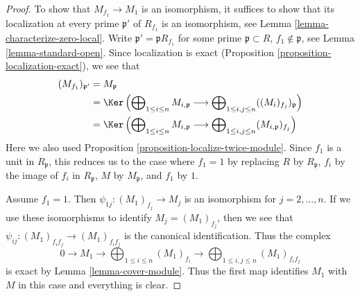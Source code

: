 \begin{proof}
To show that $M_{f_1} \to M_1$ is an isomorphism, it suffices
to show that its localization at every prime $\mathfrak p'$
of $R_{f_1}$ is an isomorphism, see
Lemma \ref{lemma-characterize-zero-local}.
Write $\mathfrak p' = \mathfrak p R_{f_1}$
for some prime $\mathfrak p \subset R$, $f_1 \not \in \mathfrak p$, see
Lemma \ref{lemma-standard-open}.
Since localization is exact
(Proposition \ref{proposition-localization-exact}),
we see that
\begin{align*}
(M_{f_1})_{\mathfrak p'} & =
M_\mathfrak p \\
& =
\Ker\left(
\bigoplus\nolimits_{1 \leq i \leq n} M_{i, \mathfrak p}
\longrightarrow
\bigoplus\nolimits_{1 \leq i, j \leq n} ((M_i)_{f_j})_\mathfrak p
\right) \\
& =
\Ker\left(
\bigoplus\nolimits_{1 \leq i \leq n} M_{i, \mathfrak p}
\longrightarrow
\bigoplus\nolimits_{1 \leq i, j \leq n} (M_{i, \mathfrak p})_{f_j}
\right)
\end{align*}
Here we also used Proposition \ref{proposition-localize-twice-module}.
Since $f_1$ is a unit in $R_\mathfrak p$, this reduces us to the case
where $f_1 = 1$ by replacing $R$ by $R_\mathfrak p$, $f_i$ by the
image of $f_i$ in $R_\mathfrak p$, $M$ by $M_\mathfrak p$, and
$f_1$ by $1$.

\medskip\noindent
Assume $f_1 = 1$. Then $\psi_{1j} : (M_1)_{f_j} \to M_j$
is an isomorphism for $j = 2, \ldots, n$. If we use these
isomorphisms to identify $M_j = (M_1)_{f_j}$, then we see
that $\psi_{ij} : (M_1)_{f_if_j} \to (M_1)_{f_if_j}$ is
the canonical identification. Thus the complex
$$
0 \to M_1 \to
\bigoplus\nolimits_{1 \leq i \leq n} (M_1)_{f_i}
\longrightarrow
\bigoplus\nolimits_{1 \leq i, j \leq n}
(M_1)_{f_if_j}
$$
is exact by Lemma \ref{lemma-cover-module}.
Thus the first map identifies $M_1$ with $M$ in this case
and everything is clear.
\end{proof}












